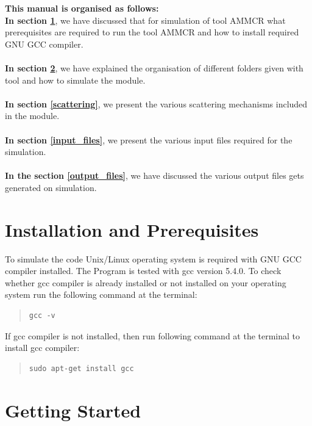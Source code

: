 \documentclass[12pt]{article}
\begin{document}
\textbf{This manual is organised as follows:} \\
\textbf{In section \ref{installation}}, we have discussed that for simulation of tool AMMCR what prerequisites are required to run the tool AMMCR and how to install required GNU GCC compiler.  \\  \\
\textbf{In section \ref{getting_started}}, we have explained the organisation of different folders given with tool and how to simulate the module. \\ \\
\textbf{In section \ref{scattering}}, we present the various scattering mechanisms included in the module. \\ \\
\textbf{In section \ref{input_files}}, we present the various input files required for the simulation. \\ \\
\textbf{In the section \ref{output_files}}, we have discussed the various output files gets generated on simulation. \\

\section{Installation and Prerequisites} \label{installation}
To simulate the code Unix/Linux operating system is required with GNU GCC compiler installed. The Program is tested with gcc version 5.4.0.
\newline To check whether gcc compiler is already installed or not installed on your operating system run the following command at the terminal:

\begin{quote}
\begin{verbatim}
gcc -v
\end{verbatim}
\end{quote}

If gcc compiler is not installed, then run following command at the terminal to install gcc compiler: 

\begin{quote}
\begin{verbatim}
sudo apt-get install gcc
\end{verbatim}
\end{quote}


\section{Getting Started} \label{getting_started}
\end{document}
